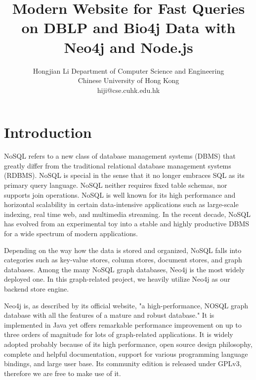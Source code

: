 \documentclass[10pt, conference, compsocconf]{../IEEEtran}
\begin{document}
\title{Modern Website for Fast Queries on DBLP and Bio4j Data with Neo4j and Node.js} %
\author
{
\IEEEauthorblockN
{
Hongjian Li
\IEEEauthorblockA
{
Department of Computer Science and Engineering\\
Chinese University of Hong Kong\\
hiji@cse.cuhk.edu.hk
}
}
}
\maketitle








\section{Introduction}

NoSQL refers to a new class of database management systems (DBMS) that greatly differ from the traditional relational database management systems (RDBMS). NoSQL is special in the sense that it no longer embraces SQL as its primary query language. NoSQL neither requires fixed table schemas, nor supports join operations. NoSQL is well known for its high performance and horizontal scalability in certain data-intensive applications such as large-scale indexing, real time web, and multimedia streaming. In the recent decade, NoSQL has evolved from an experimental toy into a stable and highly productive DBMS for a wide spectrum of modern applications.

Depending on the way how the data is stored and organized, NoSQL falls into categories such as key-value stores, column stores, document stores, and graph databases. Among the many NoSQL graph databases, Neo4j \citep{eifrem2009neo4j} is the most widely deployed one. In this graph-related project, we heavily utilize Neo4j as our backend store engine.

Neo4j is, as described by its official website, "a high-performance, NOSQL graph database with all the features of a mature and robust database." It is implemented in Java yet offers remarkable performance improvement on up to three orders of magnitude for lots of graph-related applications. It is widely adopted probably because of its high performance, open source design philosophy, complete and helpful documentation, support for various programming language bindings, and large user base. Its community edition is released under GPLv3, therefore we are free to make use of it.
\end{document}
